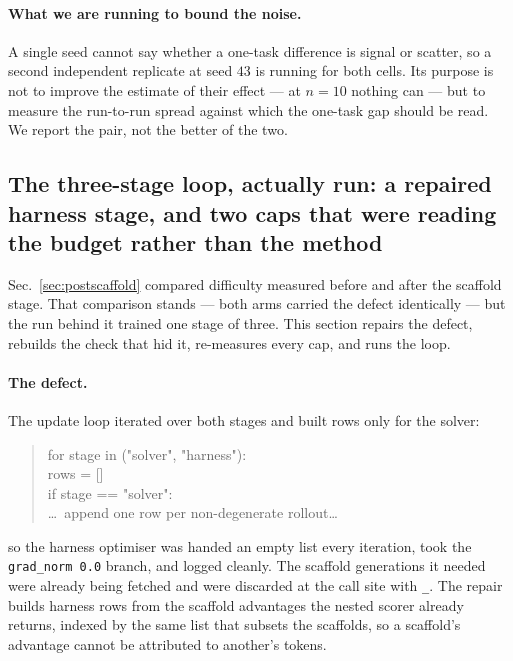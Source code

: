 \paragraph{What we are running to bound the noise.}
A single seed cannot say whether a one-task difference is signal or scatter, so a second
independent replicate at seed $43$ is running for both cells. Its purpose is not to improve the
estimate of their effect --- at $n=10$ nothing can --- but to measure the run-to-run spread
against which the one-task gap should be read. We report the pair, not the better of the two.

\subsection{The three-stage loop, actually run: a repaired harness stage, and two caps that
were reading the budget rather than the method}
\label{sec:threestage}

Sec.~\ref{sec:postscaffold} compared difficulty measured before and after the scaffold stage.
That comparison stands --- both arms carried the defect identically --- but the run behind it
trained one stage of three. This section repairs the defect, rebuilds the check that hid it,
re-measures every cap, and runs the loop.

\paragraph{The defect.} The update loop iterated over both stages and built rows only for the
solver:

\begin{quote}\small\ttfamily
for stage in ("solver", "harness"):\\
\hspace*{1em}rows = []\\
\hspace*{1em}if stage == "solver":\\
\hspace*{2em}\ldots\ append one row per non-degenerate rollout\ldots
\end{quote}

so the harness optimiser was handed an empty list every iteration, took the
\texttt{grad\_norm 0.0} branch, and logged cleanly. The scaffold generations it needed were
already being fetched and were discarded at the call site with \texttt{\_}. The repair builds
harness rows from the scaffold advantages the nested scorer already returns, indexed by the
same list that subsets the scaffolds, so a scaffold's advantage cannot be attributed to
another's tokens.

